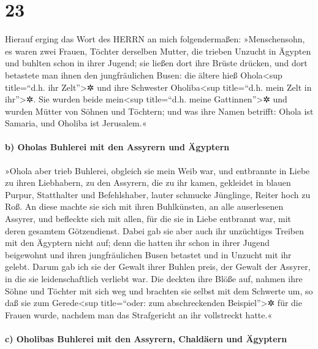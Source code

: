 \hypertarget{section-22}{%
\section{23}\label{section-22}}

Hierauf erging das Wort des HERRN an mich folgendermaßen:
»Menschensohn, es waren zwei Frauen, Töchter derselben
Mutter, die trieben Unzucht in Ägypten und buhlten schon
in ihrer Jugend; sie ließen dort ihre Brüste drücken, und dort betastete
man ihnen den jungfräulichen Busen: die ältere hieß
Ohola\textless sup title=``d.h. ihr Zelt''\textgreater✲ und ihre
Schwester Oholiba\textless sup title=``d.h. mein Zelt in
ihr''\textgreater✲. Sie wurden beide mein\textless sup title=``d.h.
meine Gattinnen''\textgreater✲ und wurden Mütter von Söhnen und
Töchtern; und was ihre Namen betrifft: Ohola ist Samaria, und Oholiba
ist Jerusalem.«

\hypertarget{b-oholas-buhlerei-mit-den-assyrern-und-uxe4gyptern}{%
\paragraph{b) Oholas Buhlerei mit den Assyrern und
Ägyptern}\label{b-oholas-buhlerei-mit-den-assyrern-und-uxe4gyptern}}

»Ohola aber trieb Buhlerei, obgleich sie mein Weib war,
und entbrannte in Liebe zu ihren Liebhabern, zu den Assyrern, die zu ihr
kamen, gekleidet in blauen Purpur, Statthalter und
Befehlshaber, lauter schmucke Jünglinge, Reiter hoch zu Roß.
An diese machte sie sich mit ihren Buhlkünsten, an alle
auserlesenen Assyrer, und befleckte sich mit allen, für die sie in Liebe
entbrannt war, mit deren gesamtem Götzendienst. Dabei gab
sie aber auch ihr unzüchtiges Treiben mit den Ägyptern nicht auf; denn
die hatten ihr schon in ihrer Jugend beigewohnt und ihren jungfräulichen
Busen betastet und in Unzucht mit ihr gelebt. Darum gab
ich sie der Gewalt ihrer Buhlen preis, der Gewalt der Assyrer, in die
sie leidenschaftlich verliebt war. Die deckten ihre Blöße
auf, nahmen ihre Söhne und Töchter mit sich weg und brachten sie selbst
mit dem Schwerte um, so daß sie zum Gerede\textless sup title=``oder:
zum abschreckenden Beispiel''\textgreater✲ für die Frauen wurde, nachdem
man das Strafgericht an ihr vollstreckt hatte.«

\hypertarget{c-oholibas-buhlerei-mit-den-assyrern-chalduxe4ern-und-uxe4gyptern}{%
\paragraph{c) Oholibas Buhlerei mit den Assyrern, Chaldäern und
Ägyptern}\label{c-oholibas-buhlerei-mit-den-assyrern-chalduxe4ern-und-uxe4gyptern}}

